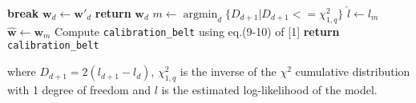 \documentclass[10pt]{article}
\DeclareMathOperator*{\argmin}{argmin}
\begin{document}
\begin{algorithm}
\begin{algorithmic}[1]
                          \EndFor
                                  \State \textbf{break}
                          \EndIf
                          \State $\mathbf{w}_d \gets \mathbf{w'}_d$ 
                          \State \textbf{return} $\mathbf{w}_d$
                  \EndProcedure
          \EndLoop
               \State $m \gets \argmin_d \{ D_{d+1} | D_{d+1} <= \chi_{1, q}^2 \}$ 
                \State $\hat{l} \gets l_m$
                \State $\hat{\mathbf{w}} \gets \mathbf{w}_m $
                \State Compute \texttt{calibration\_belt} using eq.(9-10) of [1]
                \State \textbf{return} \texttt{calibration\_belt}
          \EndProcedure
  \end{algorithmic}

\end{algorithm}
        
where $D_{d+1} = 2 (l_{d+1} - l_d)$, $\chi_{1, q}^2$ is the inverse  of the $\chi^2$ 
cumulative distribution with 1 degree of freedom and $l$ is the estimated log-likelihood 
of the model.
\end{document}
